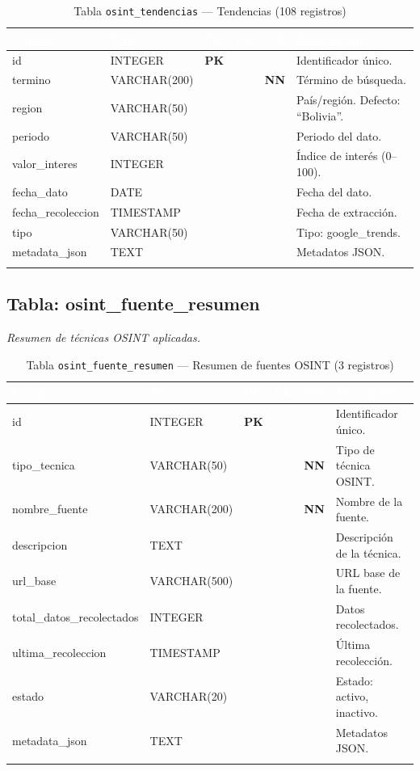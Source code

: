 \documentclass[11pt,a4paper]{article}
\newcommand{\tableheadrow}{\rowcolor{tableheader}}
\newcommand{\tablehead}[1]{\textcolor{white}{\textbf{#1}}}
\newcommand{\pk}{\textcolor{emiblue}{\textbf{PK}}}
\newcommand{\nn}{\textcolor{red!70!black}{\textbf{NN}}}
\begin{document}
\begin{longtable}{p{4.2cm} p{2.8cm} c c c p{4.5cm}}
\toprule
\tableheadrow
\tablehead{Campo} & \tablehead{Tipo} & \tablehead{PK} & \tablehead{FK} & \tablehead{NN} & \tablehead{Descripción} \\
\midrule
\endhead
id & INTEGER & \pk & & & Identificador único. \\
\rowcolor{tablerow}
termino & VARCHAR(200) & & & \nn & Término de búsqueda. \\
region & VARCHAR(50) & & & & País/región. Defecto: ``Bolivia''. \\
\rowcolor{tablerow}
periodo & VARCHAR(50) & & & & Periodo del dato. \\
valor\_interes & INTEGER & & & & Índice de interés (0--100). \\
\rowcolor{tablerow}
fecha\_dato & DATE & & & & Fecha del dato. \\
fecha\_recoleccion & TIMESTAMP & & & & Fecha de extracción. \\
\rowcolor{tablerow}
tipo & VARCHAR(50) & & & & Tipo: google\_trends. \\
metadata\_json & TEXT & & & & Metadatos JSON. \\
\bottomrule
\caption{Tabla \texttt{osint\_tendencias} — Tendencias (108 registros)}
\end{longtable}

\subsection{Tabla: osint\_fuente\_resumen}
\textit{Resumen de técnicas OSINT aplicadas.}

\begin{longtable}{p{4.2cm} p{2.8cm} c c c p{4.5cm}}
\toprule
\tableheadrow
\tablehead{Campo} & \tablehead{Tipo} & \tablehead{PK} & \tablehead{FK} & \tablehead{NN} & \tablehead{Descripción} \\
\midrule
\endhead
id & INTEGER & \pk & & & Identificador único. \\
\rowcolor{tablerow}
tipo\_tecnica & VARCHAR(50) & & & \nn & Tipo de técnica OSINT. \\
nombre\_fuente & VARCHAR(200) & & & \nn & Nombre de la fuente. \\
\rowcolor{tablerow}
descripcion & TEXT & & & & Descripción de la técnica. \\
url\_base & VARCHAR(500) & & & & URL base de la fuente. \\
\rowcolor{tablerow}
total\_datos\_recolectados & INTEGER & & & & Datos recolectados. \\
ultima\_recoleccion & TIMESTAMP & & & & Última recolección. \\
\rowcolor{tablerow}
estado & VARCHAR(20) & & & & Estado: activo, inactivo. \\
metadata\_json & TEXT & & & & Metadatos JSON. \\
\bottomrule
\caption{Tabla \texttt{osint\_fuente\_resumen} — Resumen de fuentes OSINT (3 registros)}
\end{longtable}
\end{document}
